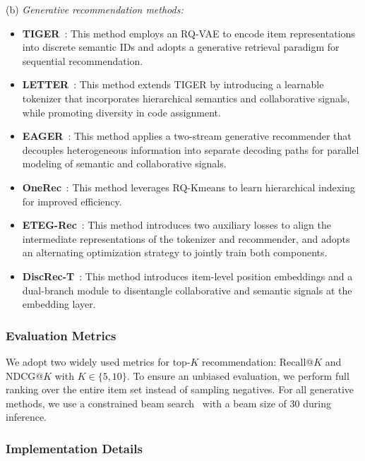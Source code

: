 (b) \noindent\textit{Generative recommendation methods:}
\begin{itemize}[leftmargin=*]

    \item \textbf{TIGER}~\cite{TIGER}: This method employs an RQ-VAE to encode item representations into discrete semantic IDs and adopts a generative retrieval paradigm for sequential recommendation.
    
    \item \textbf{LETTER}~\cite{LETTER}: This method extends TIGER by introducing a learnable tokenizer that incorporates hierarchical semantics and collaborative signals, while promoting diversity in code assignment.
    
    \item \textbf{EAGER}~\cite{EAGER}: This method applies a two-stream generative recommender that decouples heterogeneous information into separate decoding paths for parallel modeling of semantic and collaborative signals.

    \item \textbf{OneRec}~\cite{zhou2025openonerec}: This method leverages RQ-Kmeans to learn hierarchical indexing for improved efficiency.
    
    \item \textbf{ETEG-Rec}~\cite{ETEGRec}: This method introduces two auxiliary losses to align the intermediate representations of the tokenizer and recommender, and adopts an alternating optimization strategy to jointly train both components.
    
    \item \textbf{DiscRec-T}~\cite{DiscRec}: This method introduces item-level position embeddings and a dual-branch module to disentangle collaborative and semantic signals at the embedding layer.
\end{itemize}

\subsubsection{Evaluation Metrics}
\label{sec:exp_metrics}
We adopt two widely used metrics for top-$K$ recommendation: Recall@$K$ and NDCG@$K$ with $K \in \{5, 10\}$. To ensure an unbiased evaluation, we perform {full ranking} over the entire item set instead of sampling negatives. For all generative methods, we use a {constrained beam search}~\cite{LETTER} with a beam size of 30 during inference.

\subsubsection{Implementation Details}
\label{sec:exp_details}

